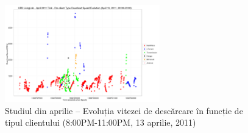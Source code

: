 \begin{figure}
  \centering
  \includegraphics[width=0.6\textwidth]{src/img/multimedia-dist/ds-evolution-day}
  \caption{Studiul din aprilie -- Evoluția vitezei de descărcare în funcție de
	  tipul clientului (8:00PM-11:00PM, 13 aprilie, 2011)}
  \label{fig:multimedia-dist:ds-evolution-day}
\end{figure}
